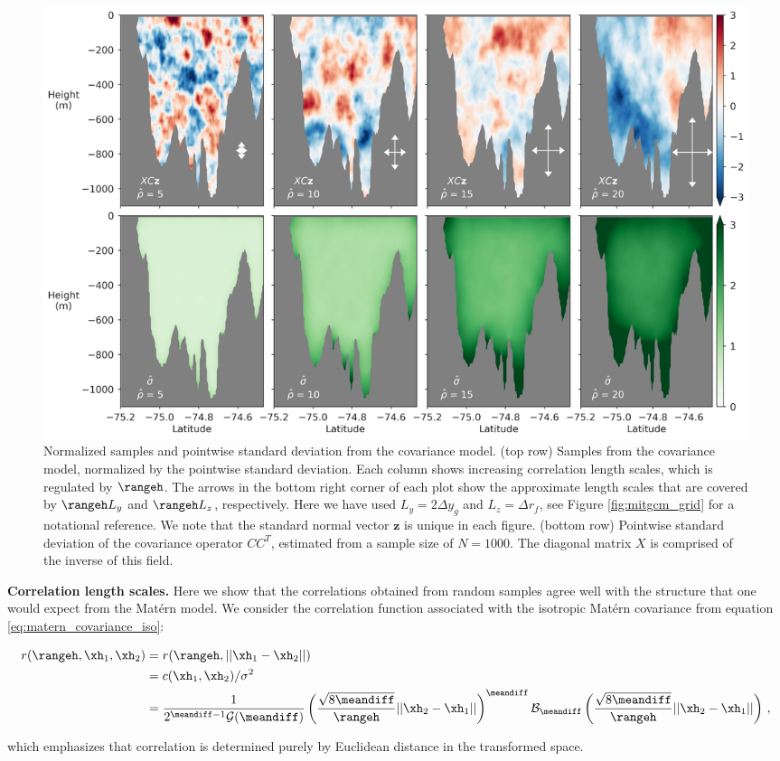 \begin{figure}
    \centering
    \includegraphics[width=\textwidth]{../figures/samples_and_pointwise_std.jpg}
    \caption{Normalized samples and pointwise standard deviation from the covariance
        model.
        (top row) Samples from the covariance model, normalized by the
        pointwise standard deviation. Each column shows increasing correlation
        length scales, which is regulated by $\rangeh$.
        The arrows in the bottom right corner of each plot show the approximate length scales
        that are covered by $\rangeh L_y$ and $\rangeh L_z$, respectively.
        Here we have used $L_y = 2\Delta y_g$ and $L_z=\Delta r_f$, see
        Figure \ref{fig:mitgcm_grid} for a notational reference.
        We note that the standard normal vector $\mathbf{z}$ is unique in
        each figure.
        (bottom row) Pointwise standard deviation of the covariance operator
        $CC^T$, estimated from
        a sample size of $N=1000$. The diagonal matrix $X$ is comprised of the
        inverse of this field.
    }
    \label{fig:matern_samples}
\end{figure}


\noindent\textbf{Correlation length scales.}
Here we show that the correlations obtained from random samples agree well with
the structure that one would expect from the Mat\'ern model.
We consider the correlation function associated with the isotropic Mat\'ern
covariance from equation \eqref{eq:matern_covariance_iso}:
\begin{linenomath*}\begin{equation*}
    \begin{aligned}
        r(\rangeh,\xh_1,\xh_2) &= r(\rangeh, ||\xh_1-\xh_2||) \\
                       &= c(\xh_1,\xh_2)/\sigma^2 \\
                       &= \dfrac{1}{2^{\meandiff-1}\mathcal{G}(\meandiff)}
        \left(\dfrac{\sqrt{8\meandiff}}{\rangeh} ||\xh_2-\xh_1||\right)^\meandiff
        \mathcal{B}_\meandiff
        \left(\dfrac{\sqrt{8\meandiff}}{\rangeh} ||\xh_2-\xh_1||\right) \, ,
    \end{aligned}
\end{equation*}\end{linenomath*}
which emphasizes that correlation is determined purely by Euclidean distance in
the transformed space.

